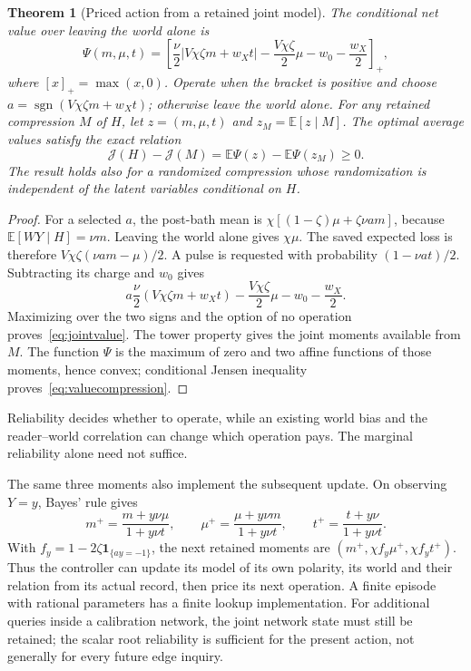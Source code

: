 \documentclass[11pt,a4paper]{article}
\newtheorem{theorem}[definition]{Theorem}
\newcommand{\E}{\mathbb E}
\newcommand{\sgn}{\operatorname{sgn}}
\begin{document}
\begin{theorem}[Priced action from a retained joint model]\label{thm:priced}
The conditional net value over leaving the world alone is
\begin{equation}\label{eq:jointvalue}
 \Psi(m,\mu,t)=\left[\frac\nu2\bigl|V\chi\zeta m+w_Xt\bigr|
             -\frac{V\chi\zeta}2\mu-w_0-\frac{w_X}2\right]_+,
\end{equation}
where $[x]_+=\max(x,0)$. Operate when the bracket is positive and choose $a=\sgn(V\chi\zeta m+w_Xt)$; otherwise leave the world alone. For any retained compression $M$ of $H$, let $z=(m,\mu,t)$ and $z_M=\E[z\mid M]$. The optimal average values satisfy the exact relation
\begin{equation}\label{eq:valuecompression}
 \mathcal J(H)-\mathcal J(M)
    =\E\Psi(z)-\E\Psi(z_M)\ge0.
\end{equation}
The result holds also for a randomized compression whose randomization is independent of the latent variables conditional on $H$.
\end{theorem}
\begin{proof}
For a selected $a$, the post-bath mean is
$\chi[(1-\zeta)\mu+\zeta\nu am]$, because $\E[WY\mid H]=\nu m$. Leaving the world alone gives $\chi\mu$. The saved expected loss is therefore $V\chi\zeta(\nu am-\mu)/2$. A pulse is requested with probability $(1-\nu at)/2$. Subtracting its charge and $w_0$ gives
\[
 a\frac\nu2(V\chi\zeta m+w_Xt)
   -\frac{V\chi\zeta}2\mu-w_0-\frac{w_X}2.
\]
Maximizing over the two signs and the option of no operation proves~\eqref{eq:jointvalue}. The tower property gives the joint moments available from $M$. The function $\Psi$ is the maximum of zero and two affine functions of those moments, hence convex; conditional Jensen inequality proves~\eqref{eq:valuecompression}.
\end{proof}

Reliability decides whether to operate, while an existing world bias and the reader--world correlation can change which operation pays. The marginal reliability alone need not suffice.

The same three moments also implement the subsequent update. On observing $Y=y$, Bayes' rule gives
\begin{equation}\label{eq:jointupdate}
 m^+=\frac{m+y\nu\mu}{1+y\nu t},\qquad
 \mu^+=\frac{\mu+y\nu m}{1+y\nu t},\qquad
 t^+=\frac{t+y\nu}{1+y\nu t}.
\end{equation}
With $f_y=1-2\zeta\mathbf1_{\{ay=-1\}}$, the next retained moments are
$(m^+,\chi f_y\mu^+,\chi f_yt^+)$. Thus the controller can update its model of its own polarity, its world and their relation from its actual record, then price its next operation. A finite episode with rational parameters has a finite lookup implementation. For additional queries inside a calibration network, the joint network state must still be retained; the scalar root reliability is sufficient for the present action, not generally for every future edge inquiry.
\end{document}
